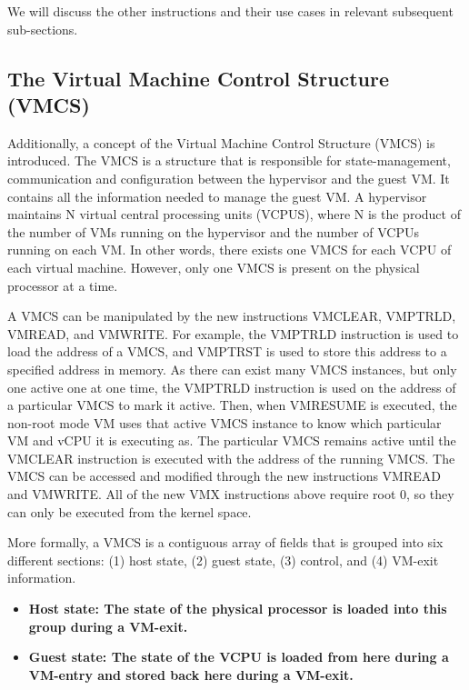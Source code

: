 \documentclass{report}
\begin{document}
\begin{spacing}{1.5}
{We will discuss the other instructions and their use cases in relevant subsequent sub-sections.
\newline
}

\subsection{The Virtual Machine Control Structure (VMCS)}

{\large
Additionally, a concept of the Virtual Machine Control Structure (VMCS) is introduced. The VMCS is a structure that is responsible for state-management, communication and configuration between the hypervisor and the guest VM. It contains all the information needed to manage the guest VM. A hypervisor maintains N virtual central processing units (VCPUS), where N is the product of the number of VMs running on the hypervisor and the number of VCPUs running on each VM. In other words, there exists one VMCS for each VCPU of each virtual machine. However, only one VMCS is present on the physical processor at a time. 
\newline
}

{\large
A VMCS can be manipulated by the new instructions VMCLEAR, VMPTRLD, VMREAD, and VMWRITE. For example, the VMPTRLD instruction is used to load the address of a VMCS, and VMPTRST is used to store this address to a specified address in memory. As there can exist many VMCS instances, but only one active one at one time, the VMPTRLD instruction is used on the address of a particular VMCS to mark it active. Then, when VMRESUME is executed, the non-root mode VM uses that active VMCS instance to know which particular VM and vCPU it is executing as. The particular VMCS remains active until the VMCLEAR instruction is executed with the address of the running VMCS. The VMCS can be accessed and modified through the new instructions VMREAD and VMWRITE. All of the new VMX instructions above require root 0, so they can only be executed from the kernel space.

More formally, a VMCS is a contiguous array of fields that is grouped into six different sections: (1) host state, (2) guest state, (3) control, and (4) VM-exit information. 
\newline
}

{\large
\begin{itemize}
    \item \bf{Host state}: The state of the physical processor is loaded into this group during a VM-exit.

    \item \bf{Guest state}: The state of the VCPU is loaded from here during a VM-entry and stored back here during a VM-exit.


\end{itemize}}
\end{spacing}
\end{document}
